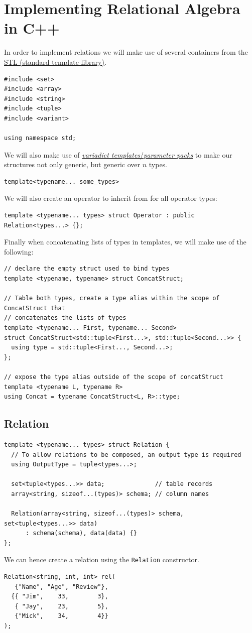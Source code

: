 \section{Implementing Relational Algebra in C++}

In order to implement relations we will make use of several containers from the 
\href{https://en.wikipedia.org/wiki/Standard_Template_Library}{STL (standard template library)}.
\begin{verbatim}
#include <set>
#include <array>
#include <string>
#include <tuple>
#include <variant>

using namespace std;
\end{verbatim}
We will also make use of \href{https://en.cppreference.com/w/cpp/language/parameter_pack}{\textit{variadict templates}/\textit{parameter packs}} to make our structures not only generic, but generic over $n$ types.
\begin{verbatim}
template<typename... some_types>
\end{verbatim}
We will also create an operator to inherit from for all operator types:
\begin{verbatim}
template <typename... types> struct Operator : public Relation<types...> {};
\end{verbatim}

Finally when concatenating lists of types in templates, we will make use of the following:
\begin{verbatim}
// declare the empty struct used to bind types
template <typename, typename> struct ConcatStruct;

// Table both types, create a type alias within the scope of ConcatStruct that 
// concatenates the lists of types 
template <typename... First, typename... Second>
struct ConcatStruct<std::tuple<First...>, std::tuple<Second...>> {
  using type = std::tuple<First..., Second...>;
};

// expose the type alias outside of the scope of concatStruct 
template <typename L, typename R>
using Concat = typename ConcatStruct<L, R>::type;
\end{verbatim}

\subsection{Relation}
\begin{verbatim}
template <typename... types> struct Relation {
  // To allow relations to be composed, an output type is required
  using OutputType = tuple<types...>;

  set<tuple<types...>> data;              // table records
  array<string, sizeof...(types)> schema; // column names

  Relation(array<string, sizeof...(types)> schema, set<tuple<types...>> data)
      : schema(schema), data(data) {}
};
\end{verbatim}
\noindent
We can hence create a relation using the \texttt{Relation} constructor.
\begin{verbatim}
Relation<string, int, int> rel(
   {"Name", "Age", "Review"},
  {{ "Jim",    33,        3}, 
   { "Jay",    23,        5}, 
   {"Mick",    34,        4}}
);
\end{verbatim}

